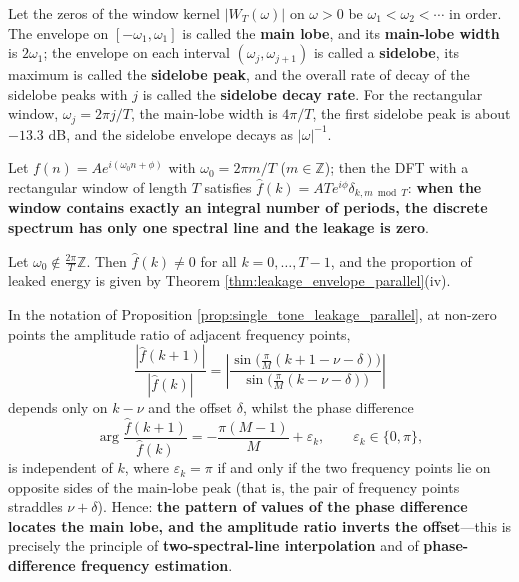\begin{definition}\label{def:mainlobe_sidelobe_parallel}
Let the zeros of the window kernel $|W_T(\omega)|$ on $\omega>0$ be $\omega_1<\omega_2<\cdots$ in order. The envelope on $[-\omega_1,\omega_1]$ is called the \textbf{main lobe}, and its \textbf{main-lobe width} is $2\omega_1$; the envelope on each interval $(\omega_j,\omega_{j+1})$ is called a \textbf{sidelobe}, its maximum is called the \textbf{sidelobe peak}, and the overall rate of decay of the sidelobe peaks with $j$ is called the \textbf{sidelobe decay rate}. For the rectangular window, $\omega_j=2\pi j/T$, the main-lobe width is $4\pi/T$, the first sidelobe peak is about $-13.3$ dB, and the sidelobe envelope decays as $|\omega|^{-1}$.
\end{definition}

\begin{corollary}\label{cor:integer_window_no_leakage}
Let $f(n)=Ae^{i(\omega_0 n+\phi)}$ with $\omega_0=2\pi m/T$ ($m\in\mathbb{Z}$); then the DFT with a rectangular window of length $T$ satisfies $\hat f(k)=ATe^{i\phi}\delta_{k,m\bmod T}$: \textbf{when the window contains exactly an integral number of periods, the discrete spectrum has only one spectral line and the leakage is zero}.
\end{corollary}

\begin{corollary}\label{cor:noninteger_window_leakage}
Let $\omega_0\notin\frac{2\pi}{T}\mathbb{Z}$. Then $\hat f(k)\ne0$ for all $k=0,\dots,T-1$, and the proportion of leaked energy is given by Theorem \ref{thm:leakage_envelope_parallel}(iv).
\end{corollary}

\begin{proposition}\label{prop:leakage_phase_characterisation}
In the notation of Proposition \ref{prop:single_tone_leakage_parallel}, at non-zero points the amplitude ratio of adjacent frequency points,
\[
\frac{|\hat f(k+1)|}{|\hat f(k)|}=\left|\frac{\sin\big(\tfrac{\pi}{M}(k+1-\nu-\delta)\big)}{\sin\big(\tfrac{\pi}{M}(k-\nu-\delta)\big)}\right|
\]
depends only on $k-\nu$ and the offset $\delta$, whilst the phase difference
\[
\arg\frac{\hat f(k+1)}{\hat f(k)}=-\frac{\pi(M-1)}{M}+\varepsilon_k,\qquad
\varepsilon_k\in\{0,\pi\},
\]
is independent of $k$, where $\varepsilon_k=\pi$ if and only if the two frequency points lie on opposite sides of the main-lobe peak (that is, the pair of frequency points straddles $\nu+\delta$). Hence: \textbf{the pattern of values of the phase difference locates the main lobe, and the amplitude ratio inverts the offset}---this is precisely the principle of \textbf{two-spectral-line interpolation} and of \textbf{phase-difference frequency estimation}.
\end{proposition}

